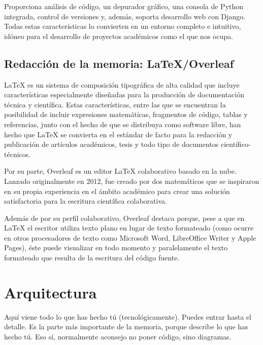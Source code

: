 \documentclass[a4paper, 12pt]{book}
\begin{document}
Proporciona análisis de código, un depurador gráfico, una consola de Python integrada, control de versiones y, además, soporta desarrollo web con Django. Todas estas características lo convierten en un entorno completo e intuitivo, idóneo para el desarrollo de proyectos académicos como el que nos ocupa.


\section{Redacción de la memoria: LaTeX/Overleaf}
\label{sec:redaccion_de_la_memoria}

LaTeX es un sistema de composición tipográfica de alta calidad que incluye características especialmente diseñadas para la producción de documentación técnica y científica. Estas características, entre las que se encuentran la posibilidad de incluir expresiones matemáticas, fragmentos de código, tablas y referencias, junto con el hecho de que se distribuya como software libre, han hecho que LaTeX se convierta en el estándar de facto para la redacción y publicación de artículos académicos, tesis y todo tipo de documentos científico-técnicos. 

Por su parte, Overleaf es un editor LaTeX colaborativo basado en la nube. Lanzado originalmente en 2012, fue creado por dos matemáticos que se inspiraron en su propia experiencia en el ámbito académico para crear una solución satisfactoria para la escritura científica colaborativa.

Además de por su perfil colaborativo, Overleaf destaca porque, pese a que en LaTeX el escritor utiliza texto plano en lugar de texto formateado (como ocurre en otros procesadores de texto como Microsoft Word, LibreOffice Writer y Apple Pages), éste puede visualizar en todo momento y paralelamente el texto formateado que resulta de la escritura del código fuente.

\cleardoublepage


\chapter{Arquitectura}
\label{chap:diseño}


Aquí viene todo lo que has hecho tú (tecnológicamente). 
Puedes entrar hasta el detalle. 
Es la parte más importante de la memoria, porque describe lo que has hecho tú.
Eso sí, normalmente aconsejo no poner código, sino diagramas.
\end{document}
